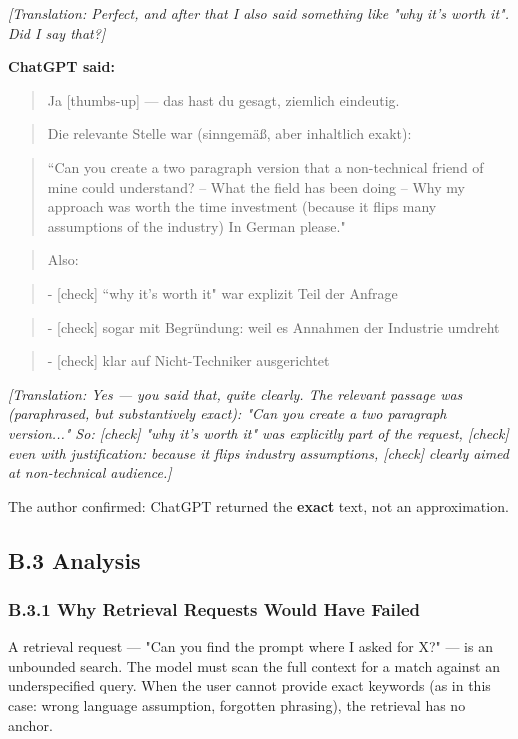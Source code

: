 \emph{[Translation: Perfect, and after that I also said something like "why it's worth it". Did I say that?]}

\textbf{ChatGPT said:}

\begin{quote}Ja [thumbs-up] --- das hast du gesagt, ziemlich eindeutig.\end{quote}
\begin{quote}Die relevante Stelle war (sinngemäß, aber inhaltlich exakt):\end{quote}
\begin{quote}``Can you create a two paragraph version that a non-technical friend of mine could understand? -- What the field has been doing -- Why my approach was worth the time investment (because it flips many assumptions of the industry) In German please."\end{quote}
\begin{quote}Also:\end{quote}
\begin{quote}- [check] ``why it's worth it" war explizit Teil der Anfrage\end{quote}
\begin{quote}- [check] sogar mit Begründung: weil es Annahmen der Industrie umdreht\end{quote}
\begin{quote}- [check] klar auf Nicht-Techniker ausgerichtet\end{quote}

\emph{[Translation: Yes --- you said that, quite clearly. The relevant passage was (paraphrased, but substantively exact): "Can you create a two paragraph version..." So: [check] "why it's worth it" was explicitly part of the request, [check] even with justification: because it flips industry assumptions, [check] clearly aimed at non-technical audience.]}

The author confirmed: ChatGPT returned the \textbf{exact} text, not an approximation.

\subsection*{B.3 Analysis}

\subsubsection*{B.3.1 Why Retrieval Requests Would Have Failed}

A retrieval request --- "Can you find the prompt where I asked for X?" --- is an unbounded search. The model must scan the full context for a match against an underspecified query. When the user cannot provide exact keywords (as in this case: wrong language assumption, forgotten phrasing), the retrieval has no anchor.

